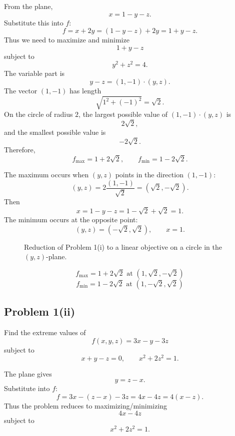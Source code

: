 \documentclass[11pt,a4paper]{article}
\begin{document}
From the plane,
\[
 x=1-y-z.
\]
Substitute this into \(f\):
\[
 f=x+2y=(1-y-z)+2y=1+y-z.
\]
Thus we need to maximize and minimize
\[
 1+y-z
\]
subject to
\[
 y^2+z^2=4.
\]
The variable part is
\[
 y-z=(1,-1)\cdot (y,z).
\]
The vector \((1,-1)\) has length
\[
 \sqrt{1^2+(-1)^2}=\sqrt2.
\]
On the circle of radius \(2\), the largest possible value of \((1,-1)\cdot(y,z)\) is
\[
 2\sqrt2,
\]
and the smallest possible value is
\[
 -2\sqrt2.
\]
Therefore,
\[
 f_{\max}=1+2\sqrt2,\qquad f_{\min}=1-2\sqrt2.
\]

The maximum occurs when \((y,z)\) points in the direction \((1,-1)\):
\[
 (y,z)=2\frac{(1,-1)}{\sqrt2}=(\sqrt2,-\sqrt2).
\]
Then
\[
 x=1-y-z=1-\sqrt2+\sqrt2=1.
\]
The minimum occurs at the opposite point:
\[
 (y,z)=(-\sqrt2,\sqrt2),\qquad x=1.
\]

\begin{figure}[H]
\centering
{}
\caption{Reduction of Problem 1(i) to a linear objective on a circle in the \((y,z)\)-plane.}
\end{figure}

\begin{answerbox}
\[
\boxed{f_{\max}=1+2\sqrt2\text{ at }(1,\sqrt2,-\sqrt2)}
\]
\[
\boxed{f_{\min}=1-2\sqrt2\text{ at }(1,-\sqrt2,\sqrt2)}
\]
\end{answerbox}

\subsection{Problem 1(ii)}
Find the extreme values of
\[
 f(x,y,z)=3x-y-3z
\]
subject to
\[
 x+y-z=0,\qquad x^2+2z^2=1.
\]

The plane gives
\[
 y=z-x.
\]
Substitute into \(f\):
\[
 f=3x-(z-x)-3z=4x-4z=4(x-z).
\]
Thus the problem reduces to maximizing/minimizing
\[
 4x-4z
\]
subject to
\[
 x^2+2z^2=1.
\]
\end{document}
